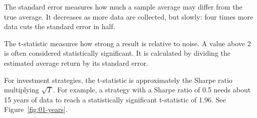 The standard error measures how much a sample average may differ from the true average. It decreases as more data are collected, but slowly: four times more data cuts the standard error in half.

The t-statistic measures how strong a result is relative to noise. A value above 2 is often considered statistically significant. It is calculated by dividing the estimated average return by its standard error.

For investment strategies, the t-statistic is approximately the Sharpe ratio  multiplying $ \sqrt{T}$. For example, a strategy with a Sharpe ratio of 0.5 needs about 15 years of data to reach a statistically significant t-statistic of 1.96.
See Figure~\ref{fig:01-years}.




